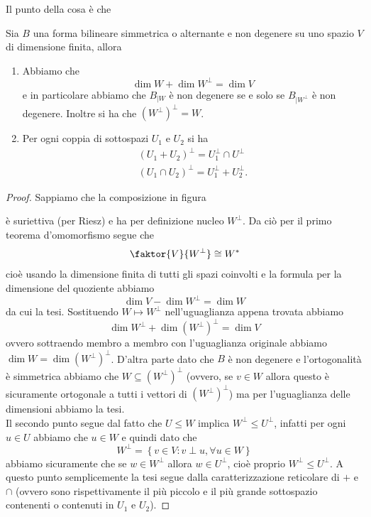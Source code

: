 \documentclass[11pt]{scrartcl}
\begin{document}
	Il punto della cosa è che 
	\begin{proposition}
		Sia $B$ una forma bilineare simmetrica o alternante e non degenere su uno spazio $V$ di dimensione finita, allora
		\begin{enumerate}
			\item Abbiamo che
			$$\dim W + \dim W^\perp = \dim V$$
			e in particolare abbiamo che $B_{\mid W}$ è non degenere se e solo se $B_{\mid W^\perp}$ è non degenere. Inoltre si ha che $\left(W^\perp\right)^\perp=W$.
			\item Per ogni coppia di sottospazi $U_1$ e $U_2$ si ha
			\begin{gather*}
				\left(U_1+U_2\right)^\perp=U_1^\perp \cap U^\perp \\
				\left(U_1\cap U_2\right)^\perp=U_1^\perp + U_2^\perp.
			\end{gather*}
		\end{enumerate}
	\end{proposition}
	\begin{proof}
		Sappiamo che la composizione in figura
		\begin{figure}
			\begin{center}
			\end{center}
		\end{figure}
		è suriettiva (per Riesz) e ha per definizione nucleo $W^\perp$. Da ciò per il primo teorema d'omomorfismo segue che
		$$\faktor{V}{W^\perp}\cong W^*$$
		cioè usando la dimensione finita di tutti gli spazi coinvolti e la formula per la dimensione del quoziente abbiamo
		$$\dim V - \dim W^\perp = \dim W$$
		da cui la tesi. Sostituendo $W\mapsto W^\perp$ nell'uguaglianza appena trovata abbiamo 
		$$\dim W^\perp + \dim \left(W^\perp\right)^\perp = \dim V$$ 
		ovvero sottraendo membro a membro con l'uguaglianza originale abbiamo $\dim W = \dim \left(W^\perp\right)^\perp$. D'altra parte dato che $B$ è non degenere e l'ortogonalità è simmetrica abbiamo che $W\subseteq \left(W^\perp\right)^\perp$ (ovvero, se $v\in W$ allora questo è sicuramente ortogonale a tutti i vettori di $\left(W^\perp\right)^\perp$) ma per l'uguaglianza delle dimensioni abbiamo la tesi. \\
		Il secondo punto segue dal fatto che $U\le W$ implica $W^\perp \le U^\perp$, infatti per ogni $u\in U$ abbiamo che $u\in W$ e quindi dato che 
		$$W^\perp=\left\{v\in V:v\perp u, \forall u\in W\right\}$$
		abbiamo sicuramente che se $w\in W^\perp$ allora $w\in U^\perp$, cioè proprio $W^\perp \le U^\perp$. A questo punto semplicemente la tesi segue dalla caratterizzazione reticolare di $+$ e $\cap$ (ovvero sono rispettivamente il più piccolo e il più grande sottospazio contenenti o contenuti in $U_1$ e $U_2$).
	\end{proof}
	
\end{document}
